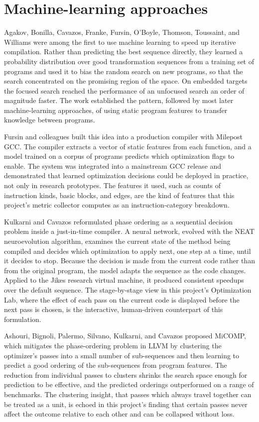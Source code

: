 \section*{Machine-learning approaches}

Agakov, Bonilla, Cavazos, Franke, Fursin, O'Boyle, Thomson, Toussaint, and Williams \cite{agakov2006} were among the first to use machine learning to speed up iterative compilation. Rather than predicting the best sequence directly, they learned a probability distribution over good transformation sequences from a training set of programs and used it to bias the random search on new programs, so that the search concentrated on the promising region of the space. On embedded targets the focused search reached the performance of an unfocused search an order of magnitude faster. The work established the pattern, followed by most later machine-learning approaches, of using static program features to transfer knowledge between programs.

Fursin and colleagues \cite{fursin2011} built this idea into a production compiler with Milepost GCC. The compiler extracts a vector of static features from each function, and a model trained on a corpus of programs predicts which optimization flags to enable. The system was integrated into a mainstream GCC release and demonstrated that learned optimization decisions could be deployed in practice, not only in research prototypes. The features it used, such as counts of instruction kinds, basic blocks, and edges, are the kind of features that this project's metric collector computes as an instruction-category breakdown.

Kulkarni and Cavazos \cite{kulkarnicavazos2012} reformulated phase ordering as a sequential decision problem inside a just-in-time compiler. A neural network, evolved with the NEAT neuroevolution algorithm, examines the current state of the method being compiled and decides which optimization to apply next, one step at a time, until it decides to stop. Because the decision is made from the current code rather than from the original program, the model adapts the sequence as the code changes. Applied to the Jikes research virtual machine, it produced consistent speedups over the default sequence. The stage-by-stage view in this project's Optimization Lab, where the effect of each pass on the current code is displayed before the next pass is chosen, is the interactive, human-driven counterpart of this formulation.

Ashouri, Bignoli, Palermo, Silvano, Kulkarni, and Cavazos \cite{ashouri2017} proposed MiCOMP, which mitigates the phase-ordering problem in LLVM by clustering the optimizer's passes into a small number of sub-sequences and then learning to predict a good ordering of the sub-sequences from program features. The reduction from individual passes to clusters shrinks the search space enough for prediction to be effective, and the predicted orderings outperformed  on a range of benchmarks. The clustering insight, that passes which always travel together can be treated as a unit, is echoed in this project's finding that certain passes never affect the outcome relative to each other and can be collapsed without loss.

